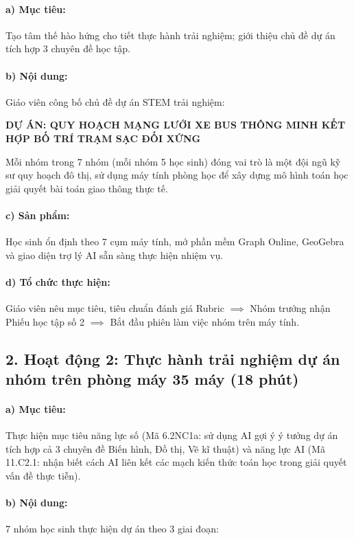 \documentclass[12pt, a4paper]{article}
\begin{document}
\paragraph{a) Mục tiêu:} Tạo tâm thế hào hứng cho tiết thực hành trải nghiệm; giới thiệu chủ đề dự án tích hợp 3 chuyên đề học tập.

\paragraph{b) Nội dung:} Giáo viên công bố chủ đề dự án STEM trải nghiệm:
\begin{center}
    \textbf{\large DỰ ÁN: QUY HOẠCH MẠNG LƯỚI XE BUS THÔNG MINH KẾT HỢP BỐ TRÍ TRẠM SẠC ĐỐI XỨNG}
\end{center}
Mỗi nhóm trong 7 nhóm (mỗi nhóm 5 học sinh) đóng vai trò là một đội ngũ kỹ sư quy hoạch đô thị, sử dụng máy tính phòng học để xây dựng mô hình toán học giải quyết bài toán giao thông thực tế.

\paragraph{c) Sản phẩm:} Học sinh ổn định theo 7 cụm máy tính, mở phần mềm Graph Online, GeoGebra và giao diện trợ lý AI sẵn sàng thực hiện nhiệm vụ.

\paragraph{d) Tổ chức thực hiện:} Giáo viên nêu mục tiêu, tiêu chuẩn đánh giá Rubric $\implies$ Nhóm trưởng nhận Phiếu học tập số 2 $\implies$ Bắt đầu phiên làm việc nhóm trên máy tính.

\subsection*{2. Hoạt động 2: Thực hành trải nghiệm dự án nhóm trên phòng máy 35 máy (18 phút)}

\paragraph{a) Mục tiêu:} Thực hiện mục tiêu năng lực số (Mã 6.2NC1a: sử dụng AI gợi ý ý tưởng dự án tích hợp cả 3 chuyên đề Biến hình, Đồ thị, Vẽ kĩ thuật) và năng lực AI (Mã 11.C2.1: nhận biết cách AI liên kết các mạch kiến thức toán học trong giải quyết vấn đề thực tiễn).

\paragraph{b) Nội dung:} 7 nhóm học sinh thực hiện dự án theo 3 giai đoạn:
\end{document}
